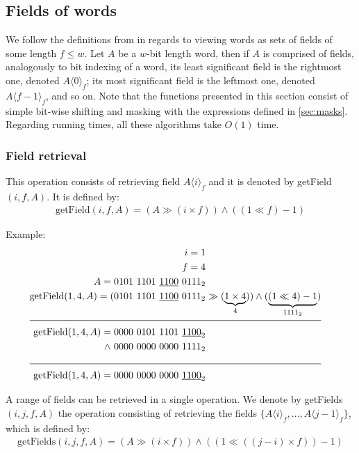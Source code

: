 \subsection{Fields of words} \label{sec:fieldsOfWords}

We follow the definitions from \cite{patrascu2014dynamic} in regards to viewing words as sets of fields of some length $f \leq w$. Let $A$ be a $w$-bit length word, then if $A$ is comprised of fields, analogously to bit indexing of a word, its least significant field is the rightmost one, denoted $A\langle0\rangle_f$; its most significant field is the leftmost one, denoted $A\langle f-1\rangle_f$, and so on.
Note that the functions presented in this section consist of simple bit-wise shifting and masking with the expressions defined in \ref{sec:masks}. Regarding running times, all these algorithms take $O(1)$ time.

\subsubsection{Field retrieval} \label{sec:fieldRetrieval}

This operation consists of retrieving field $A\langle i\rangle_f$ and it is denoted by getField$(i, f, A)$. It is defined by:
\begin{align*}
    \text{getField}(i, f, A) = (A \gg (i \times f)) \wedge ((1 \ll f) - 1)
\end{align*}

Example:
\begin{align*}
    i = 1\\
    f = 4\\
    A = 0101\ 1101\ \underline{1100}\ 0111_2& \\
    \text{getField}(1, 4, A) = (0101\ 1101\ \underline{1100}\ 0111_2& \gg (\underbrace{1 \times 4}_{4})) \wedge (\underbrace{(1 \ll 4) - 1}_{1111_2})\\
    \cline{1-2}
    \text{getField}(1, 4, A) = 0000\ 0101\ 1101\ \underline{1100}_2& \\
    \wedge\ 0000\ 0000\ 0000\ 1111_2& \\
    \cline{1-2}
    \text{getField}(1, 4, A) = 0000\ 0000\ 0000\ \underline{1100}_2&
\end{align*}

A range of fields can be retrieved in a single operation. We denote by getFields$(i, j, f, A)$ the operation consisting of retrieving the fields $\{A\langle i\rangle_f,\dots , A\langle j-1\rangle_f\}$, which is defined by:
\begin{align*}
    \text{getFields}(i, j, f, A) = (A \gg (i \times f)) \wedge ((1 \ll ((j - i) \times f)) - 1)
\end{align*}

